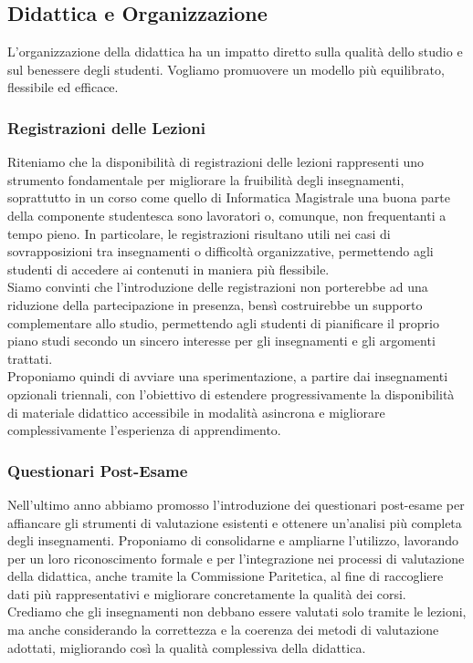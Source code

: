 \documentclass[12pt,a4paper]{article}
\begin{document}
\subsection{Didattica e Organizzazione}
L’organizzazione della didattica ha un impatto diretto sulla qualità dello studio e sul benessere degli studenti. Vogliamo promuovere un modello più equilibrato, flessibile ed efficace.
\subsubsection{Registrazioni delle Lezioni}
Riteniamo che la disponibilità di registrazioni delle lezioni rappresenti uno strumento fondamentale per migliorare la fruibilità degli insegnamenti, soprattutto in un corso come quello di Informatica Magistrale una buona parte della componente studentesca sono lavoratori o, comunque, non frequentanti a tempo pieno. In particolare, le registrazioni  risultano utili nei casi di sovrapposizioni tra insegnamenti o difficoltà organizzative, permettendo agli studenti di accedere ai contenuti in maniera più flessibile.
\\ Siamo convinti che l’introduzione delle registrazioni non porterebbe ad una riduzione della partecipazione in presenza, bensì costruirebbe un supporto complementare allo studio, permettendo agli studenti di pianificare il proprio piano studi secondo un sincero interesse per gli insegnamenti e gli argomenti trattati.
\\ Proponiamo quindi di avviare una sperimentazione, a partire dai insegnamenti opzionali triennali, con l’obiettivo di estendere progressivamente la disponibilità di materiale didattico accessibile in modalità asincrona e migliorare complessivamente l’esperienza di apprendimento.

\subsubsection{Questionari Post-Esame}
Nell’ultimo anno abbiamo promosso l’introduzione dei questionari post-esame per affiancare gli strumenti di valutazione esistenti e ottenere un’analisi più completa degli insegnamenti. Proponiamo di consolidarne e ampliarne l’utilizzo, lavorando per un loro riconoscimento formale e per l’integrazione nei processi di valutazione della didattica, anche tramite la Commissione Paritetica, al fine di raccogliere dati più rappresentativi e migliorare concretamente la qualità dei corsi.\\Crediamo che gli insegnamenti non debbano essere valutati solo tramite le lezioni, ma anche considerando la correttezza e la coerenza dei metodi di valutazione adottati, migliorando così la qualità complessiva della didattica.
\end{document}
